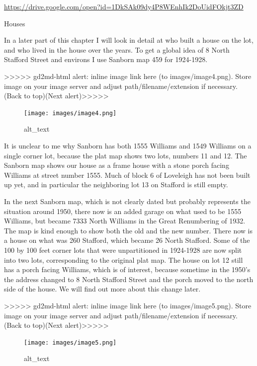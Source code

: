 \documentclass[
  12pt,
]{book}
\begin{document}
\url{https://drive.google.com/open?id=1DkSAk09dy4P8WEnhIk2DoUidFOkjt3ZD}

Houses

In a later part of this chapter I will look in detail at who built a house on the lot, and who lived in the house over the years. To get a global idea of 8 North Stafford Street and environs I use Sanborn map 459 for 1924-1928.

{\textgreater\textgreater\textgreater\textgreater\textgreater{} gd2md-html alert: inline image link here (to images/image4.png). Store image on your image server and adjust path/filename/extension if necessary. }(Back to top)(Next alert){\textgreater\textgreater\textgreater\textgreater\textgreater{} }

\begin{figure}
\centering
\texttt{[image: images/image4.png]}
\caption{alt\_text}
\end{figure}

It is unclear to me why Sanborn has both 1555 Williams and 1549 Williams on a single corner lot, because the plat map shows two lots, numbers 11 and 12. The Sanborn map shows our house as a frame house with a stone porch facing Williams at street number 1555. Much of block 6 of Loveleigh has not been built up yet, and in particular the neighboring lot 13 on Stafford is still empty.

In the next Sanborn map, which is not clearly dated but probably represents the situation around 1950, there now is an added garage on what used to be 1555 Williams, but became 7333 North Williams in the Great Renumbering of 1932. The map is kind enough to show both the old and the new number. There now is a house on what was 260 Stafford, which became 26 North Stafford. Some of the 100 by 100 feet corner lots that were unpartitioned in 1924-1928 are now split into two lots, corresponding to the original plat map. The house on lot 12 still has a porch facing Williams, which is of interest, because sometime in the 1950's the address changed to 8 North Stafford Street and the porch moved to the north side of the house. We will find out more about this change later.

{\textgreater\textgreater\textgreater\textgreater\textgreater{} gd2md-html alert: inline image link here (to images/image5.png). Store image on your image server and adjust path/filename/extension if necessary. }(Back to top)(Next alert){\textgreater\textgreater\textgreater\textgreater\textgreater{} }

\begin{figure}
\centering
\texttt{[image: images/image5.png]}
\caption{alt\_text}
\end{figure}
\end{document}
